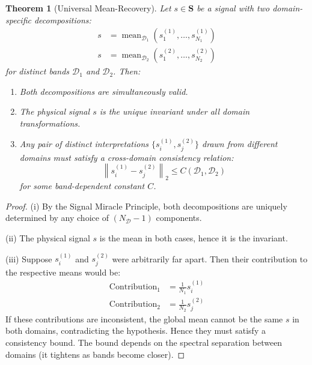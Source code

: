 \documentclass[twocolumn,11pt,a4paper]{article}
\newtheorem{theorem}{Theorem}[section]
\newcommand{\signal}{s}
\newcommand{\Signal}{\mathbf{S}}
\newcommand{\domain}{\mathcal{D}}
\newcommand{\mean}{\operatorname{mean}}
\begin{document}
\begin{theorem}[Universal Mean-Recovery]
\label{thm:universal_mean_recovery}
Let $\signal \in \Signal$ be a signal with two domain-specific decompositions:
\begin{align}
  \signal &= \mean_{\domain_1}(\signal_1^{(1)}, \ldots, \signal_{N_1}^{(1)})\\
  \signal &= \mean_{\domain_2}(\signal_1^{(2)}, \ldots, \signal_{N_2}^{(2)})
\end{align}
for distinct bands $\domain_1$ and $\domain_2$. Then:
\begin{enumerate}[nosep,label=(\roman*)]
  \item Both decompositions are simultaneously valid.
  \item The physical signal $\signal$ is the unique invariant under all domain transformations.
  \item Any pair of distinct interpretations $\{\signal_i^{(1)}, \signal_j^{(2)}\}$ drawn from different domains must satisfy a cross-domain consistency relation:
  \begin{equation}
    \left\| \signal_i^{(1)} - \signal_j^{(2)} \right\|_2 \leq C(\domain_1, \domain_2)
  \end{equation}
  for some band-dependent constant $C$.
\end{enumerate}
\end{theorem}

\begin{proof}
(i) By the Signal Miracle Principle, both decompositions are uniquely determined by any choice of $(N_\domain - 1)$ components.

(ii) The physical signal $\signal$ is the mean in both cases, hence it is the invariant.

(iii) Suppose $\signal_i^{(1)}$ and $\signal_j^{(2)}$ were arbitrarily far apart. Then their contribution to the respective means would be:
\begin{align}
  \text{Contribution}_1 &= \frac{1}{N_1}\signal_i^{(1)}\\
  \text{Contribution}_2 &= \frac{1}{N_2}\signal_j^{(2)}
\end{align}
If these contributions are inconsistent, the global mean cannot be the same $\signal$ in both domains, contradicting the hypothesis. Hence they must satisfy a consistency bound. The bound depends on the spectral separation between domains (it tightens as bands become closer).
\end{proof}
\end{document}
